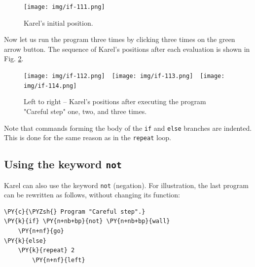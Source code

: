 \begin{figure}[!ht]
\begin{center}
\texttt{[image: img/if-111.png]}
\vspace{-0mm}
\caption{Karel's initial position.}
\label{fig:if-111}
\end{center}
\end{figure}
\noindent
Now let us run the program three times by clicking three times on the green arrow button. 
The sequence of Karel's positions after each evaluation is shown in 
Fig. \ref{fig:if-112}.

\begin{figure}[!ht]
\begin{center}
\texttt{[image: img/if-112.png]}\ \ 
\texttt{[image: img/if-113.png]}\ \ 
\texttt{[image: img/if-114.png]}
\vspace{-0mm}
\caption{Left to right -- Karel's positions after executing the program "Careful step" one, two, and three times.}
\label{fig:if-112}
\vspace{-4mm}
\end{center}
\end{figure}
\noindent

\begin{gbox}
\begin{center}
Note that commands forming the body of the {\tt if} and {\tt else} branches are indented.
This is done for the same reason as in the {\tt repeat} loop. 
\end{center}
\end{gbox}

\subsection{Using the keyword {\tt not}}

Karel can also use the keyword {\tt not} (negation). For illustration, the last 
program can be rewritten as follows, without changing its function:\\

\begin{bbox}
\begin{Verbatim}[commandchars=\\\{\}]
\PY{c}{\PYZsh{} Program "Careful step".}
\PY{k}{if} \PY{n+nb+bp}{not} \PY{n+nb+bp}{wall}
    \PY{n+nf}{go}
\PY{k}{else}
    \PY{k}{repeat} 2
        \PY{n+nf}{left}
\end{Verbatim}
\end{bbox}


